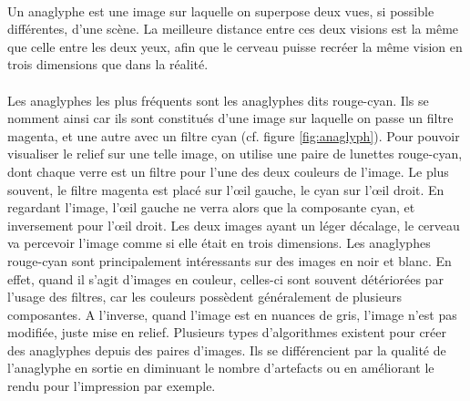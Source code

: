 \paragraph{}
	Un anaglyphe est une image sur laquelle on superpose deux vues, si possible différentes, d’une scène. La meilleure distance entre ces deux visions est la même que celle entre les deux yeux, afin que le cerveau puisse recréer la même vision en trois dimensions que dans la réalité.
	
\paragraph{}
	Les anaglyphes les plus fréquents sont les anaglyphes dits rouge-cyan. Ils se nomment ainsi car ils sont constitués d’une image sur laquelle on passe un filtre magenta, et une autre avec un filtre cyan (cf. figure \ref{fig:anaglyph}). Pour pouvoir visualiser le relief sur une telle image, on utilise une paire de lunettes rouge-cyan, dont chaque verre est un filtre pour l’une des deux couleurs de l’image. Le plus souvent, le filtre magenta est placé sur l’œil gauche, le cyan sur l’œil droit. En regardant l’image, l’œil gauche ne verra alors que la composante cyan, et inversement pour l’œil droit. Les deux images ayant un léger décalage, le cerveau va percevoir l’image comme si elle était en trois dimensions. Les anaglyphes rouge-cyan sont principalement intéressants sur des images en noir et blanc. En effet, quand il s’agit d’images en couleur, celles-ci sont souvent détériorées par l’usage des filtres, car les couleurs possèdent généralement de plusieurs composantes. A l’inverse, quand l’image est en nuances de gris, l’image n’est pas modifiée, juste mise en relief. Plusieurs types d'algorithmes existent pour créer des anaglyphes depuis des paires d'images. Ils se différencient par la qualité de l'anaglyphe en sortie en diminuant le nombre d'artefacts \cite{steteroAnaglyph} ou en améliorant le rendu pour l'impression \cite{printAnaglyph} par exemple.

